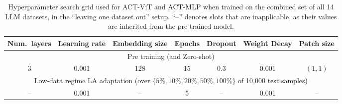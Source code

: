 \begin{table}[t]
\centering
\caption{Hyperparameter search grid used for ACT-ViT and ACT-MLP when trained on the combined
set of all 14 LLM datasets, in the ``leaving one dataset out'' setup. ``--'' denotes slots that are
inapplicable, as their values are inherited from the pre-trained model.}
\label{tab:hp_loo}
\renewcommand{\arraystretch}{1.15}
\small
\begin{tabular}{|c|c|c|c|c|c|c|}
\hline
Num.\ layers & Learning rate & Embedding size & Epochs & Dropout & Weight Decay & Patch size \\
\hline
\multicolumn{7}{|c|}{Pre training (and Zero-shot)} \\
\hline
3 & 0.001 & 128 & 15 & 0.3 & 0.001 & $(1,1)$ \\
\hline
\multicolumn{7}{|c|}{Low-data regime LA adaptation (over $\{5\%, 10\%, 20\%, 50\%, 100\%\}$ of 10{,}000 test samples)} \\
\hline
-- & 0.001 & -- & 5 & -- & 0.001 & -- \\
\hline
\end{tabular}
\end{table}

